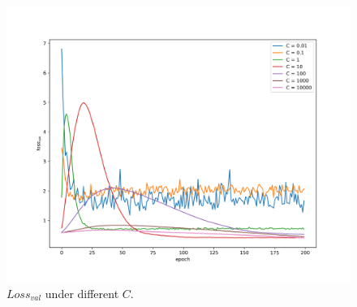 \documentclass[journal, a4paper]{IEEEtran}
\begin{document}
\begin{figure}[!hbt]
	\begin{center}
		\includegraphics[width=\columnwidth]{c_val_loss}
		\caption{$Loss_{val}$ under different $C$.}
		\label{fig:C_loss}
	\end{center}
\end{figure} \par
\end{document}
